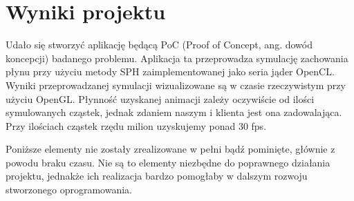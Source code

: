 \documentclass[polish, 12pt]{aghthesis}
\begin{document}
\section{Wyniki projektu}

Udało się stworzyć aplikację będącą PoC (Proof of Concept, ang. dowód koncepcji) badanego problemu. Aplikacja ta przeprowadza symulację zachowania płynu przy użyciu metody SPH zaimplementowanej jako seria jąder OpenCL. Wyniki przeprowadzanej symulacji wizualizowane są w czasie rzeczywistym przy użyciu OpenGL. Płynność uzyskanej animacji zależy oczywiście od ilości symulowanych cząstek, jednak zdaniem naszym i klienta jest ona zadowalająca. Przy ilościach cząstek rzędu milion uzyskujemy ponad 30 fps.
		
		Poniższe elementy nie zostały zrealizowane w pełni bądź pominięte, głównie z powodu braku czasu. Nie są to elementy niezbędne do poprawnego działania projektu, jednakże ich realizacja bardzo pomogłaby w dalszym rozwoju stworzonego oprogramowania.
		
\end{document}
